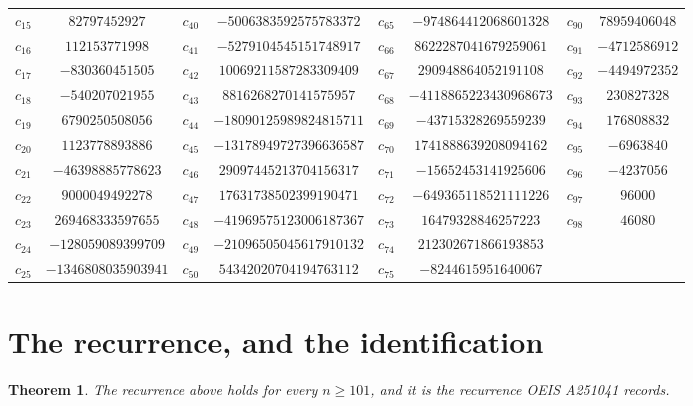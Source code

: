 \documentclass[11pt,a4paper]{article}
\theoremstyle{plain}
\newtheorem{theorem}{Theorem}
\theoremstyle{definition}
\begin{document}
\begin{center}
\begin{tabular}{cccccccc}
$c_{15}$ & $82797452927$ & $c_{40}$ & $-5006383592575783372$ & $c_{65}$ & $-974864412068601328$ & $c_{90}$ & $78959406048$ \\
$c_{16}$ & $112153771998$ & $c_{41}$ & $-5279104545151748917$ & $c_{66}$ & $8622287041679259061$ & $c_{91}$ & $-4712586912$ \\
$c_{17}$ & $-830360451505$ & $c_{42}$ & $10069211587283309409$ & $c_{67}$ & $290948864052191108$ & $c_{92}$ & $-4494972352$ \\
$c_{18}$ & $-540207021955$ & $c_{43}$ & $8816268270141575957$ & $c_{68}$ & $-4118865223430968673$ & $c_{93}$ & $230827328$ \\
$c_{19}$ & $6790250508056$ & $c_{44}$ & $-18090125989824815711$ & $c_{69}$ & $-43715328269559239$ & $c_{94}$ & $176808832$ \\
$c_{20}$ & $1123778893886$ & $c_{45}$ & $-13178949727396636587$ & $c_{70}$ & $1741888639208094162$ & $c_{95}$ & $-6963840$ \\
$c_{21}$ & $-46398885778623$ & $c_{46}$ & $29097445213704156317$ & $c_{71}$ & $-15652453141925606$ & $c_{96}$ & $-4237056$ \\
$c_{22}$ & $9000049492278$ & $c_{47}$ & $17631738502399190471$ & $c_{72}$ & $-649365118521111226$ & $c_{97}$ & $96000$ \\
$c_{23}$ & $269468333597655$ & $c_{48}$ & $-41969575123006187367$ & $c_{73}$ & $16479328846257223$ & $c_{98}$ & $46080$ \\
$c_{24}$ & $-128059089399709$ & $c_{49}$ & $-21096505045617910132$ & $c_{74}$ & $212302671866193853$ &  &  \\
$c_{25}$ & $-1346808035903941$ & $c_{50}$ & $54342020704194763112$ & $c_{75}$ & $-8244615951640067$ &  &  \\
\end{tabular}
\end{center}

\section{The recurrence, and the identification}

\begin{theorem}
The recurrence above holds for every $n\ge101$, and it is the recurrence OEIS A251041 records.
\end{theorem}
\end{document}

